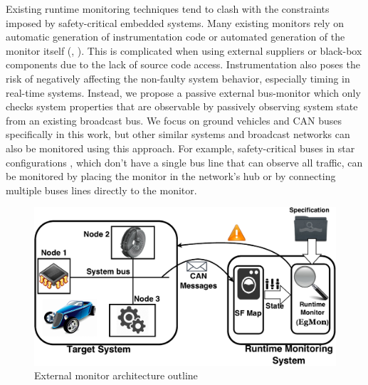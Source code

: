 Existing runtime monitoring techniques tend to clash with the constraints imposed by safety-critical embedded systems. 
Many existing monitors rely on automatic generation of instrumentation code or automated generation of the monitor itself (\eg, \cite{Havelund2004, Pike2011}).
This is complicated when using external suppliers or black-box components due to the lack of source code access. Instrumentation also poses the risk of negatively affecting the non-faulty system behavior, especially timing in real-time systems.
Instead, we propose a passive external bus-monitor which only checks system properties that are observable by passively observing system state from an existing broadcast bus.
We focus on ground vehicles and CAN buses specifically in this work, but other similar systems and broadcast networks can also be monitored using this approach.
For example, safety-critical buses in star configurations \cite{Rushby2001}, which don't have a single bus line that can observe all traffic, can be monitored by placing the monitor in the network's hub or by connecting multiple buses lines directly to the monitor. 

\begin{figure}[!h]
\includegraphics[scale=0.5]{img/ARV-main.pdf}
\caption{External monitor architecture outline \label{fig:architecture}}
\end{figure}


